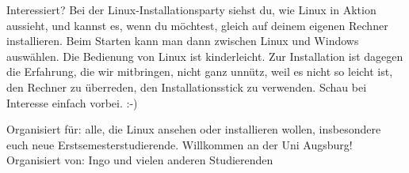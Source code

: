 \documentclass[a4paper,ngerman,landscape,12pt]{scrartcl}
\begin{document}
\begin{center}
  \noindent
  \normalsize
  Interessiert? Bei der Linux-Installationsparty siehst du, wie Linux in Aktion
  aussieht, und kannst es, wenn du möchtest, gleich auf deinem eigenen Rechner
  installieren. Beim Starten kann man dann zwischen Linux und Windows
  auswählen. Die Bedienung von Linux ist kinderleicht. Zur Installation ist
  dagegen die Erfahrung, die wir mitbringen, nicht ganz unnütz, weil es nicht
  so leicht ist, den Rechner zu überreden, den Installationsstick zu verwenden.
  Schau bei Interesse einfach vorbei. :-)

  \noindent
  Organisiert für: alle, die Linux ansehen oder installieren wollen,
  insbesondere euch neue Erstsemesterstudierende. Willkommen an der Uni
  Augsburg!
  Organisiert von: Ingo und vielen anderen Studierenden
\end{center}
\end{document}
